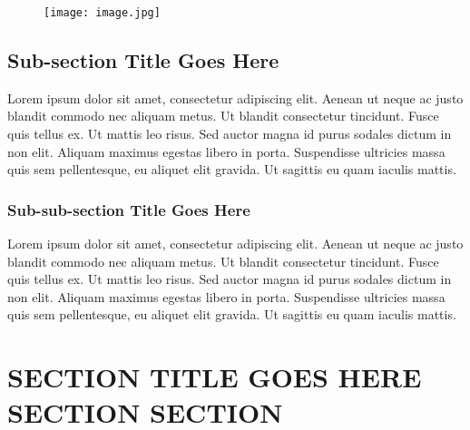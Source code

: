 \documentclass{csmagazine}
\begin{document}

\begin{figure}[ht!]
	\begin{center}	
	\texttt{[image: image.jpg]}
	\end{center}
\end{figure}

\subsection*{Sub-section Title Goes Here}

Lorem ipsum dolor sit amet, consectetur adipiscing elit. Aenean ut neque ac justo blandit commodo nec aliquam metus. Ut blandit consectetur tincidunt. Fusce quis tellus ex. Ut mattis leo risus. Sed auctor magna id purus sodales dictum in non elit. Aliquam maximus egestas libero in porta. Suspendisse ultricies massa quis sem pellentesque, eu aliquet elit gravida. Ut sagittis eu quam iaculis mattis.

\subsubsection*{Sub-sub-section Title Goes Here}

Lorem ipsum dolor sit amet, consectetur adipiscing elit. Aenean ut neque ac justo blandit commodo nec aliquam metus. Ut blandit consectetur tincidunt. Fusce quis tellus ex. Ut mattis leo risus. Sed auctor magna id purus sodales dictum in non elit. Aliquam maximus egestas libero in porta. Suspendisse ultricies massa quis sem pellentesque, eu aliquet elit gravida. Ut sagittis eu quam iaculis mattis.

\section*{SECTION TITLE GOES HERE SECTION SECTION}
\end{document}
